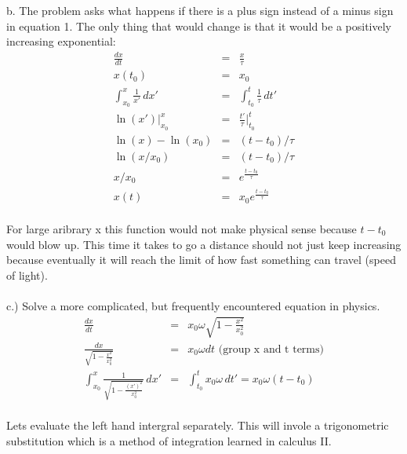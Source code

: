 \documentclass[11pt]{amsart}
\begin{document}
b. The problem asks what happens if there is a plus sign instead of a minus sign in equation 1. The only thing that would change is that it would be a positively increasing exponential: \\ 
\begin{eqnarray*} 
\frac{dx}{dt} &=& \frac{x}{\tau} \\
x(t_{0}) &=& x_{0} \\
\int^{x}_{x_{0}}\frac{1}{x'}\,dx' &=& \int^{t}_{t_{0}}\frac{1}{\tau}\,dt' \\
\ln(x')|^{x}_{x_{0}} &=&\frac{t'}{\tau}|^{t}_{t_{0}} \\
\ln(x) - \ln(x_{0}) &=& (t - t_{0})/\tau \\
\ln(x/x_{0}) &=& (t - t_{0})/\tau \\
x/x_{0} &=& e^{\frac{t-t_{0}}{\tau}} \\
x(t) &=& x_{0}e^{\frac{t-t_{0}}{\tau}} 
\end{eqnarray*} \\
For large aribrary x this function would not make physical sense because $t-t_{0}$ would blow up. This time it takes to go a distance should not just keep increasing because eventually it will reach the limit of how fast something can travel (speed of light). \\  \\
c.) Solve a more complicated, but frequently encountered equation in physics. \\ 
\begin{eqnarray*} 
\frac{dx}{dt} &=& x_{0}\omega{}\sqrt{1 - \frac{x^{2}}{x_{0}^{2}}} \\
\frac{dx}{\sqrt{1 - \frac{x^{2}}{x_{0}^{2}}}} &=& x_{0}\omega{}dt \mbox{ (group x and t terms)} \\
\int^{x}_{x_{0}}\frac{1}{\sqrt{1 - \frac{(x')^{2}}{x_{0}^{2}}}}\,dx' &=& \int^{t}_{t_{0}}x_{0}\omega\,dt' = x_{0}\omega{}(t - t_{0}) 
\end{eqnarray*} \\
Lets evaluate the left hand intergral separately. This will invole a trigonometric substitution which is a method of integration learned in calculus II. \\
\end{document}
